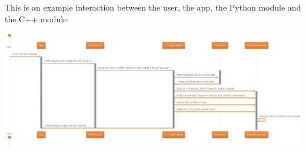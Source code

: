 This is an example interaction between the user, the app, the Python module and the C++ module:

\includegraphics[width=1\textwidth]{tesi/img/activity-install-widget.png}